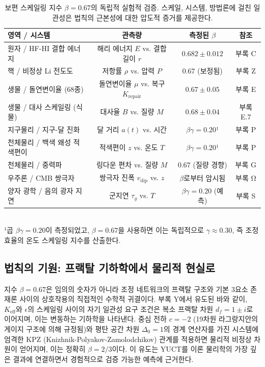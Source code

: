 \documentclass[11pt,a4paper]{article}
\begin{document}
\begin{table}[htbp]
	\centering
	\small
	\setlength{\tabcolsep}{0pt}
	\caption{보편 스케일링 지수 $\beta = 0.67$의 독립적 실험적 검증. 스케일, 시스템, 방법론에 걸친 일관성은 법칙의 근본성에 대한 압도적 증거를 제공한다.}
	\label{tab:scaling_confirmations}
	\begin{tabular}{@{}lccc@{}}
		\toprule
		\textbf{영역 / 시스템} & \textbf{관측량} & \textbf{측정된 $\beta$} & \textbf{참조} \\
		\midrule
		원자 / HF-HI 결합 에너지 & 해리 에너지 $E$ vs. 결합 길이 $r$ & $0.682 \pm 0.012$ & 부록 C \\
		핵 / 비정상 Li 전도도 & 저항률 $\rho$ vs. 압력 $P$ & $0.67$ (보정됨) & 부록 Z \\
		생물 / 돌연변이율 (68종) & 돌연변이율 $\mu$ vs. 복구 $K_{\mathrm{repair}}$ & $0.67 \pm 0.05$ & 부록 E \\
		생물 / 대사 스케일링 (식물) & 대사율 $B$ vs. 질량 $M$ & $0.68 \pm 0.04$ & 부록 E.7 \\
		지구물리 / 지구-달 진화 & 달 거리 $a(t)$ vs. 시간 & $\beta\gamma = 0.20$¹ & 부록 P \\
		천체물리 / 백색 왜성 적색편이 & 적색편이 $z$ vs. 온도 $T$ & $\beta\gamma = 0.20$¹ & 부록 P \\
		천체물리 / 중력파 & 링다운 편차 vs. 질량 $M$ & $0.67$ (질량 경향) & 부록 G \\
		우주론 / CMB 쌍극자 & 쌍극자 진폭 $v_{\mathrm{dip}}$ vs. $z$ & $\beta$로부터 암시됨 & 부록 Ω \\
		양자 광학 / 음의 광자 지연 & 군지연 $\tau_g$ vs. $T$ & $\beta\gamma = 0.20$ (예측) & 부록 S \\
		\bottomrule
	\end{tabular}
	\\[4pt]
	\footnotesize{¹곱 $\beta\gamma = 0.20$이 측정되었고, $\beta = 0.67$을 사용하면 이는 독립적으로 $\gamma \approx 0.30$, 즉 조정 효율의 온도 스케일링 지수를 산출한다.}
\end{table}

\subsection{법칙의 기원: 프랙탈 기하학에서 물리적 현실로}

지수 $\beta = 0.67$은 임의의 숫자가 아니라 조정 네트워크의 프랙탈 구조와 기본 3요소 존재론 사이의 상호작용의 직접적인 수학적 귀결이다. 부록 Y에서 유도된 바와 같이, $K_{\mathrm{eff}}$와 $\epsilon$의 스케일링 사이의 자기 일관성 요구 조건은 복소 프랙탈 차원 $d_f = 1 \pm i$로 이어지며, 이는 변동하는 기하학을 나타낸다. 중심 전하 $c = -2$ (19차원 라그랑지안의 게이지 구조에 의해 규정됨)와 평탄 공간 차원 $\Delta_0 = 1$의 경계 연산자를 가진 시스템에 엄격한 KPZ (Knizhnik-Polyakov-Zamolodchikov) 관계를 적용하면 물리적 비정상 차원이 얻어지며, 이는 정확히 $\beta = 2/3$이다. 이 유도는 YUCT를 이론 물리학의 가장 깊은 결과에 연결하면서 경험적으로 검증 가능한 예측에 근거한다.
\end{document}
